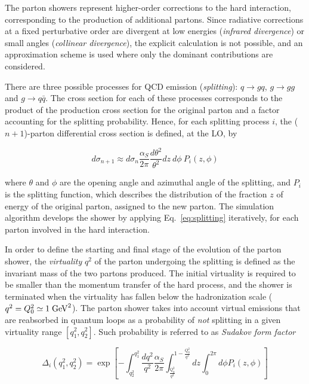 The parton showers represent higher-order corrections to the hard
interaction, corresponding to the production of additional partons.
Since radiative corrections at a fixed perturbative order are
divergent at low energies ({\it infrared divergence}) or small angles
({\it collinear divergence}), the explicit calculation is not possible,
and an approximation scheme is used where only the dominant
contributions are considered.

There are three possible processes for QCD emission ({\it splitting}): 
$q\to gq$, $g\to gg$ and $g\to q\bar{q}$.
The cross section for each of these processes corresponds to the
product of the production cross section for the original parton and a
factor accounting for the splitting probability. Hence, for each
splitting process $i$, the ($n+1$)-parton differential cross section is
defined, at the LO, by

\begin{equation}
  d\sigma_{n+1}\approx{} d\sigma_{n}
  \frac{\alpha_S}{2\pi}\frac{d\theta^2}{\theta^2} dz~d\phi~P_i(z,\phi) 
 \label{eq:splitting}
\end{equation}

where $\theta$ and $\phi$ are the opening angle and azimuthal angle of
the splitting, and $P_i$ is the splitting function, which describes
the distribution of the fraction $z$ of energy of the original parton,
assigned to the new parton.
The simulation algorithm develops the shower by applying
Eq.~\ref{eq:splitting} iteratively, for each parton involved in the
hard interaction.

In order to define the starting and final stage of the evolution of
the parton shower, the {\it virtuality} $q^2$ of the parton undergoing
the splitting is defined as the invariant mass of the two partons
produced. The initial virtuality is required to be smaller than the
momentum transfer of the hard process, and the shower is terminated
when the virtuality has fallen below the hadronization scale
($q^2=Q_0^2\simeq1\; \mathrm{GeV}^2$).
The parton shower takes into account virtual emissions that are
reabsorbed in quantum loops as a probability of {\it not} splitting in
a given virtuality range $[q_1^2,q_2^2]$. Such probability is referred
to as {\it Sudakov form factor}

\begin{equation}
  \label{eq:sudakov} 
  \Delta_i (q_1^2, q_2^2) = \exp \left[ - \int_{q_2^2}^{q_1^2}
    \frac{dq^2}{q^2} \frac{\alpha_S}{2\pi}
    \int_{\frac{Q_0^2}{q^2}}^{1-\frac{Q_0^2}{q^2}} dz \int_0^{2\pi} d\phi{} P_{i} (z,\phi) \right]
  \end{equation}

